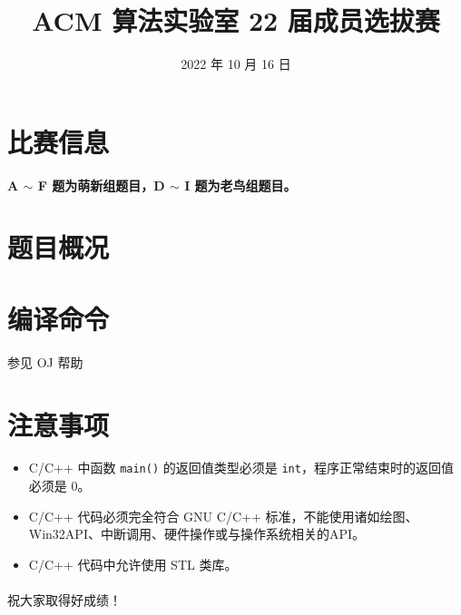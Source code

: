 \documentclass{../cpct/ctpro}
\title{ACM 算法实验室 22 届成员选拔赛}
\date{2022 年 10 月 16 日}
\begin{document}
\maketitle
{}


\section*{比赛信息}

\begin{remark}
    \textbf{A $\sim$ F 题为萌新组题目，D $\sim$ I 题为老鸟组题目。}
\end{remark}


\section*{题目概况}

\problemtab

\section*{编译命令}

参见 OJ 帮助

\section*{注意事项}

\begin{itemize}
    \item C/C++ 中函数 \lstinline{main()} 的返回值类型必须是 \lstinline{int}，程序正常结束时的返回值必须是 $0$。
    \item C/C++ 代码必须完全符合 GNU C/C++ 标准，不能使用诸如绘图、Win32API、中断调用、硬件操作或与操作系统相关的API。
    \item C/C++ 代码中允许使用 STL 类库。
\end{itemize}

\paragraph*{} 祝大家取得好成绩！
\end{document}
